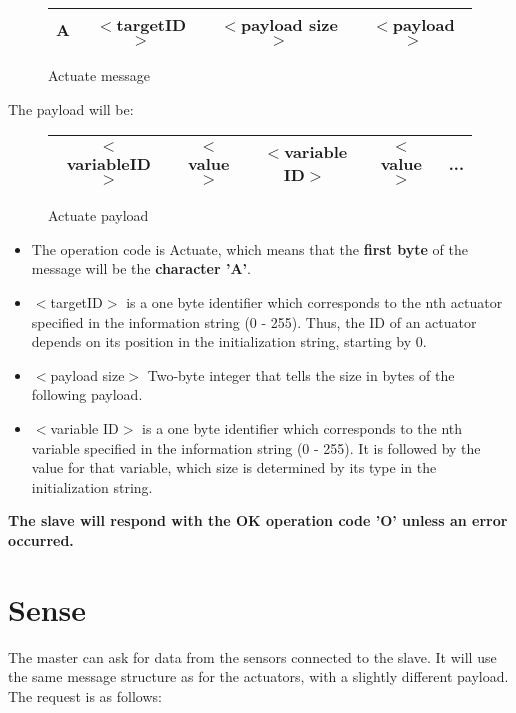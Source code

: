 \documentclass[11pt,a4paper,oneside]{book}
\begin{document}
\begin{figure}[h]
\centering
\label{fig:ActuateRequest}
\begin{tabular}{|c|c|c|c|}
\hline 
A & $<$targetID$>$ & $<$payload size$>$ & $<$payload$>$ \\ 
\hline 
\end{tabular} 
\caption{Actuate message}
\end{figure}

The payload will be:

\begin{figure}[h]
\centering
\label{fig:ActuatePayload}
\begin{tabular}{|c|c|c|c|c|}
\hline 
$<$variableID$>$ & $<$value$>$ & $<$variable ID$>$ & $<$value$>$ & ... \\
\hline
\end{tabular} 
\caption{Actuate payload}
\end{figure}

\begin{itemize}

\item The operation code is Actuate, which means that the \textbf{first byte} of the message will be the\textbf{ character 'A'}.

\item $<$targetID$>$ is a one byte identifier which corresponds to the nth actuator specified in the information string (0 - 255). Thus, the ID of an actuator depends on its position in the initialization string, starting by 0.

\item $<$payload size$>$ Two-byte integer that tells the size in bytes of the following payload.

\item $<$variable ID$>$ is a one byte identifier which corresponds to the nth variable specified in the information string (0 - 255). It is followed by the value for that variable, which size is determined by its type in the initialization string.

\end{itemize}

\textbf{The slave will respond with the OK operation code 'O' unless an error occurred.}

\section{Sense}

The master can ask for data from the sensors connected to the slave. It will use the same message structure as for the actuators, with a slightly different payload. The request is as follows:
\end{document}
